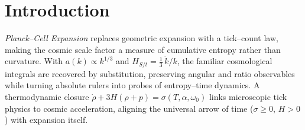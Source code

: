 \section*{Introduction}

\emph{Planck--Cell Expansion} replaces geometric expansion with a tick--count
law, making the cosmic scale factor a measure of cumulative entropy rather than
curvature.  With $a(k) \propto k^{1/3}$ and $H_{S/t} = \tfrac{1}{3}\,\dot{k}/k$,
the familiar cosmological integrals are recovered by substitution, preserving
angular and ratio observables while turning absolute rulers into probes of
entropy--time dynamics.  A thermodynamic closure
$\dot{\rho} + 3H(\rho + p) = \sigma(T, \alpha, \omega_0)$ links microscopic tick
physics to cosmic acceleration, aligning the universal arrow of time
($\sigma \ge 0$, $H > 0$) with expansion itself.
